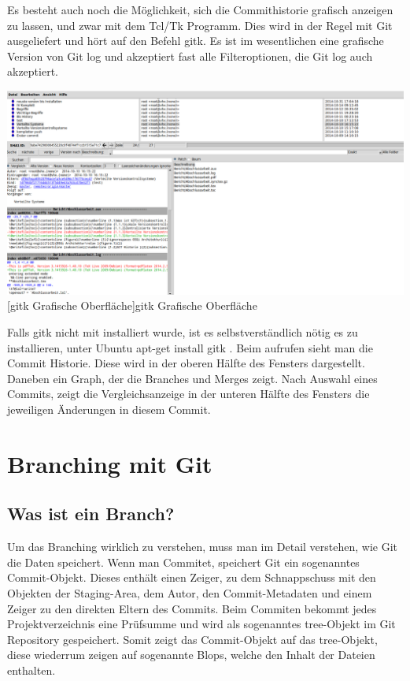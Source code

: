 \documentclass[12pt,a4paper,bibliography=totocnumbered,listof=totocnumbered]{scrartcl}
\begin{document}
Es besteht auch noch die Möglichkeit, sich die Commithistorie grafisch anzeigen zu lassen, und zwar mit dem Tcl/Tk Programm.
Dies wird in der Regel mit Git ausgeliefert und hört auf den Befehl gitk. Es ist im wesentlichen eine grafische Version von Git log und akzeptiert fast alle Filteroptionen, die Git log auch akzeptiert.

\vspace{1em}
\begin{minipage}{\linewidth}
	\centering
	\includegraphics[width=0.9\linewidth]{Bilder/gitk.png}
	[gitk Grafische Oberfläche]{gitk Grafische Oberfläche}
	\label{gitk Grafische Oberfläche}
\end{minipage}

Falls gitk nicht mit installiert wurde, ist es selbstverständlich nötig es zu installieren, unter Ubuntu apt-get install gitk .
Beim aufrufen sieht man die Commit Historie. Diese wird in der oberen Hälfte des Fensters dargestellt. Daneben ein Graph, der die Branches und Merges zeigt. Nach Auswahl eines Commits, zeigt die Vergleichsanzeige in der unteren Hälfte des Fensters die jeweiligen Änderungen in diesem Commit.



\section{Branching mit Git}

\subsection{Was ist ein Branch?}
Um das Branching wirklich zu verstehen, muss man im Detail verstehen, wie Git die Daten speichert. Wenn man Commitet, speichert Git ein sogenanntes Commit-Objekt. Dieses enthält einen Zeiger, zu dem Schnappschuss mit den Objekten der Staging-Area, dem Autor, den Commit-Metadaten und einem Zeiger zu den direkten Eltern des Commits. Beim Commiten bekommt jedes Projektverzeichnis eine Prüfsumme und wird  als sogenanntes tree-Objekt im Git Repository gespeichert. Somit zeigt das Commit-Objekt auf das tree-Objekt,	diese wiederrum zeigen auf sogenannte Blops, welche den Inhalt der Dateien enthalten.	
\end{document}
